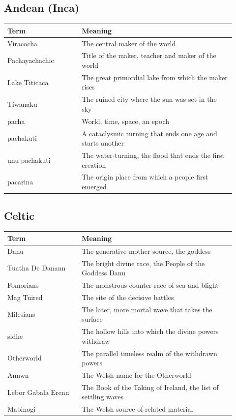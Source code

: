 \subsection{Andean (Inca)}

\begin{longtable}{L{0.30\linewidth} L{0.62\linewidth}}
\toprule
\textbf{Term} & \textbf{Meaning} \\
\midrule
\endhead
Viracocha & The central maker of the world \\
Pachayachachic & Title of the maker, teacher and maker of the world \\
Lake Titicaca & The great primordial lake from which the maker rises \\
Tiwanaku & The ruined city where the sun was set in the sky \\
pacha & World, time, space, an epoch \\
pachakuti & A cataclysmic turning that ends one age and starts another \\
unu pachakuti & The water-turning, the flood that ends the first creation \\
pacarina & The origin place from which a people first emerged \\
\bottomrule
\end{longtable}

\subsection{Celtic}

\begin{longtable}{L{0.30\linewidth} L{0.62\linewidth}}
\toprule
\textbf{Term} & \textbf{Meaning} \\
\midrule
\endhead
Danu & The generative mother source, the goddess \\
Tuatha De Danann & The bright divine race, the People of the Goddess Danu \\
Fomorians & The monstrous counter-race of sea and blight \\
Mag Tuired & The site of the decisive battles \\
Milesians & The later, more mortal wave that takes the surface \\
sidhe & The hollow hills into which the divine powers withdraw \\
Otherworld & The parallel timeless realm of the withdrawn powers \\
Annwn & The Welsh name for the Otherworld \\
Lebor Gabala Erenn & The Book of the Taking of Ireland, the list of settling waves \\
Mabinogi & The Welsh source of related material \\
\bottomrule
\end{longtable}

